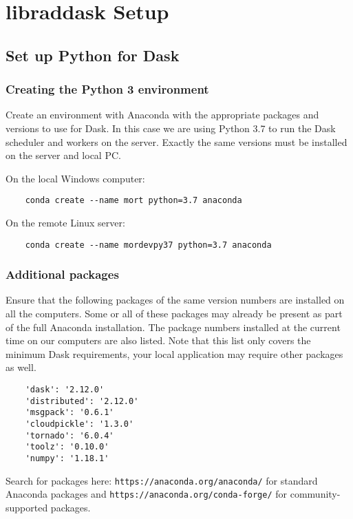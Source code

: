 
\chapter{libraddask Setup}
\label{chap:libraddaskSetup}

\section{Set up Python for Dask}

\subsection{Creating the Python 3 environment}

Create an environment with Anaconda with the appropriate packages and versions to use for Dask.
In this case we are using Python 3.7 to run the Dask scheduler and workers on the server.
Exactly the same versions must be installed on the server and local PC.

On the local Windows computer:
\begin{lstlisting}
    conda create --name mort python=3.7 anaconda
\end{lstlisting}

On the remote Linux server:
\begin{lstlisting}
    conda create --name mordevpy37 python=3.7 anaconda
\end{lstlisting}


\subsection{Additional packages}
\label{sec:Additionalpackages}

Ensure that the following packages of the same version numbers are installed on all the computers. 
Some or all of these packages may already be present as part of the full Anaconda installation.
The package numbers installed at the current time on our computers are also listed.
Note that this list only covers the minimum Dask requirements, your local application may require other packages as well.
\begin{lstlisting}
    'dask': '2.12.0'
    'distributed': '2.12.0'
    'msgpack': '0.6.1'
    'cloudpickle': '1.3.0'
    'tornado': '6.0.4'
    'toolz': '0.10.0'
    'numpy': '1.18.1'
\end{lstlisting}

Search for packages here: 
\lstinline{https://anaconda.org/anaconda/} for standard Anaconda packages and 
\lstinline{https://anaconda.org/conda-forge/} for community-supported packages.

